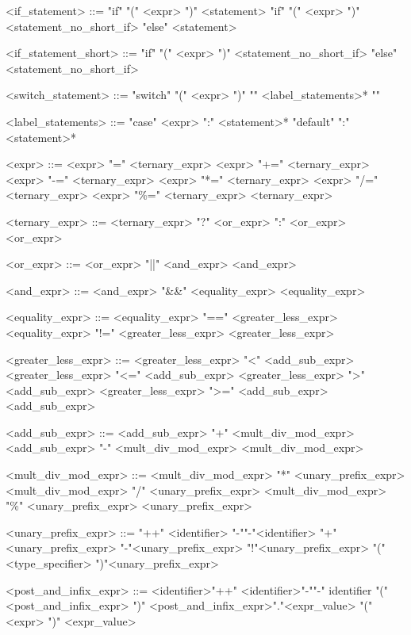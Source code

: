 \begin{grammar}
 <if\_statement> ::= "if" "(" <expr> ")" <statement>
 \alt "if" "(" <expr> ")" <statement\_no\_short\_if> "else" <statement>
 
 <if\_statement\_short> ::= "if" "(" <expr> ")" <statement\_no\_short\_if> "else" <statement\_no\_short\_if>
 
 <switch\_statement> ::= "switch" "(" <expr> ")" "{" <label\_statements>* "}"
 
 <label\_statements> ::= "case" <expr> ":" <statement>*
 \alt "default" ":" <statement>*
 
 <expr> ::= <expr> "=" <ternary\_expr>
 \alt <expr> "+=" <ternary\_expr>
 \alt <expr> "-=" <ternary\_expr>
 \alt <expr> "*=" <ternary\_expr>
 \alt <expr> "/=" <ternary\_expr>
 \alt <expr> "\%=" <ternary\_expr>
 \alt <ternary\_expr>
 
 <ternary\_expr> ::= <ternary\_expr> "?" <or\_expr> ":" <or\_expr>
 \alt <or\_expr>
 
 <or\_expr> ::= <or\_expr> "||" <and\_expr>
 \alt <and\_expr>
 
 <and\_expr> ::= <and\_expr> "&&" <equality\_expr>
 \alt <equality\_expr>
 
 <equality\_expr> ::= <equality\_expr> "==" <greater\_less\_expr>
 \alt <equality\_expr> "!=" <greater\_less\_expr>
 \alt <greater\_less\_expr>
 
 <greater\_less\_expr> ::= <greater\_less\_expr> "<" <add\_sub\_expr>
 \alt <greater\_less\_expr> "<=" <add\_sub\_expr>
 \alt <greater\_less\_expr> ">" <add\_sub\_expr>
 \alt <greater\_less\_expr> ">=" <add\_sub\_expr>
 \alt <add\_sub\_expr>
 
 <add\_sub\_expr> ::= <add\_sub\_expr> "+" <mult\_div\_mod\_expr>
 \alt <add\_sub\_expr> "-" <mult\_div\_mod\_expr>
 \alt <mult\_div\_mod\_expr>
 
 <mult\_div\_mod\_expr> ::= <mult\_div\_mod\_expr> "*" <unary\_prefix\_expr>
 \alt <mult\_div\_mod\_expr> "/" <unary\_prefix\_expr>
 \alt <mult\_div\_mod\_expr> "\%" <unary\_prefix\_expr>
 \alt <unary\_prefix\_expr>
 
 <unary\_prefix\_expr> ::= "++" <identifier>
 \alt "-""-"<identifier>
 \alt "+"<unary\_prefix\_expr>
 \alt "-"<unary\_prefix\_expr>
 \alt "!"<unary\_prefix\_expr>
 \alt "(" <type\_specifier> ")"<unary\_prefix\_expr>
 
 <post\_and\_infix\_expr> ::= <identifier>"++"
 \alt <identifier>"-""-"
 \alt identifier "(" <post\_and\_infix\_expr> ")"
 \alt <post\_and\_infix\_expr>"."<expr\_value>
 \alt "(" <expr> ")"
 \alt <expr\_value>
 

\end{grammar}
